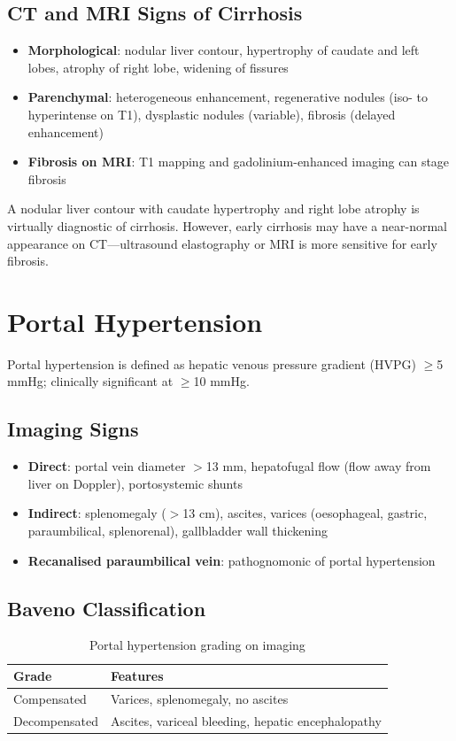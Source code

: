 \subsection{CT and MRI Signs of Cirrhosis}
\begin{itemize}
  \item \textbf{Morphological}: nodular liver contour, hypertrophy of caudate and left lobes, atrophy of right lobe, widening of fissures
  \item \textbf{Parenchymal}: heterogeneous enhancement, regenerative nodules (iso- to hyperintense on T1), dysplastic nodules (variable), fibrosis (delayed enhancement)
  \item \textbf{Fibrosis on MRI}: T1 mapping and gadolinium-enhanced imaging can stage fibrosis
\end{itemize}

\begin{pearlbox}
A nodular liver contour with caudate hypertrophy and right lobe atrophy is virtually diagnostic of cirrhosis. However, early cirrhosis may have a near-normal appearance on CT---ultrasound elastography or MRI is more sensitive for early fibrosis.
\end{pearlbox}

\section{Portal Hypertension}

Portal hypertension is defined as hepatic venous pressure gradient (HVPG) $\geq$5 mmHg; clinically significant at $\geq$10 mmHg.

\subsection{Imaging Signs}
\begin{itemize}
  \item \textbf{Direct}: portal vein diameter $>$13 mm, hepatofugal flow (flow away from liver on Doppler), portosystemic shunts
  \item \textbf{Indirect}: splenomegaly ($>$13 cm), ascites, varices (oesophageal, gastric, paraumbilical, splenorenal), gallbladder wall thickening
  \item \textbf{Recanalised paraumbilical vein}: pathognomonic of portal hypertension
\end{itemize}

\subsection{Baveno Classification}
\begin{table}[h]
\centering
\caption{Portal hypertension grading on imaging}
\begin{tabular}{|l|l|}
\hline
\textbf{Grade} & \textbf{Features} \\
\hline
Compensated & Varices, splenomegaly, no ascites \\
Decompensated & Ascites, variceal bleeding, hepatic encephalopathy \\
\hline
\end{tabular}
\end{table}

